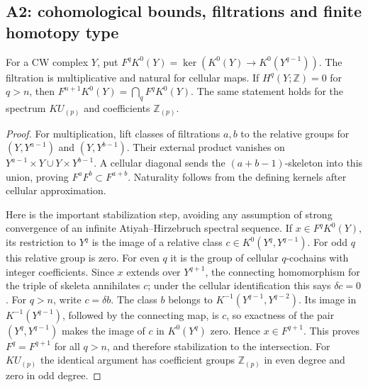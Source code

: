 \subsection{A2: cohomological bounds, filtrations and finite homotopy type}

\begin{lemma}\label{A:filtration}
For a CW complex $Y$, put
$F^qK^0(Y)=\ker(K^0(Y)\to K^0(Y^{q-1}))$.
The filtration is multiplicative and natural for cellular maps.
If $H^q(Y;\mathbb Z)=0$ for $q>n$, then
$F^{n+1}K^0(Y)=\bigcap_q F^qK^0(Y)$.
The same statement holds for the spectrum $KU_{(p)}$ and coefficients
$\mathbb Z_{(p)}$.
\end{lemma}
\begin{proof}
For multiplication, lift classes of filtrations $a,b$ to the relative groups
for $(Y,Y^{a-1})$ and $(Y,Y^{b-1})$. Their external product vanishes on
$Y^{a-1}\times Y\cup Y\times Y^{b-1}$. A cellular diagonal sends the
$(a+b-1)$-skeleton into this union, proving $F^aF^b\subset F^{a+b}$.
Naturality follows from the defining kernels after cellular approximation.

Here is the important stabilization step, avoiding any assumption of strong
convergence of an infinite Atiyah--Hirzebruch spectral sequence. If
$x\in F^qK^0(Y)$, its restriction to $Y^q$ is the image of a relative class
$c\in K^0(Y^q,Y^{q-1})$. For odd $q$ this relative group is zero. For even $q$
it is the group of cellular $q$-cochains with integer coefficients. Since $x$
extends over $Y^{q+1}$, the connecting homomorphism for the triple of skeleta
annihilates $c$; under the cellular identification this says $\delta c=0$.
For $q>n$, write $c=\delta b$. The class $b$ belongs to
$K^{-1}(Y^{q-1},Y^{q-2})$. Its image in $K^{-1}(Y^{q-1})$, followed by the
connecting map, is $c$, so exactness of the pair $(Y^q,Y^{q-1})$ makes the
image of $c$ in $K^0(Y^q)$ zero. Hence $x\in F^{q+1}$. This proves
$F^q=F^{q+1}$ for all $q>n$, and therefore stabilization to the intersection.
For $KU_{(p)}$ the identical argument has coefficient groups
$\mathbb Z_{(p)}$ in even degree and zero in odd degree.
\end{proof}

